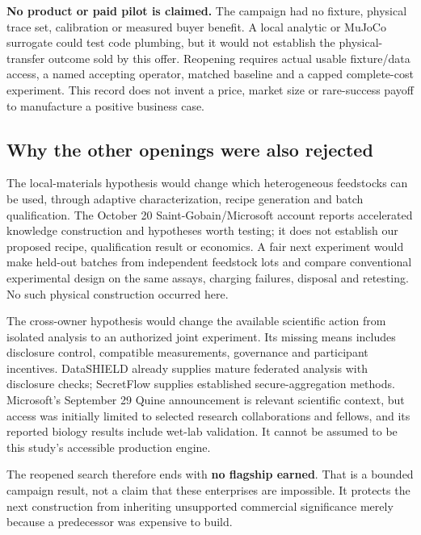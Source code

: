 \textbf{No product or paid pilot is claimed.} The campaign had no fixture, physical trace set, calibration or measured buyer benefit. A local analytic or MuJoCo surrogate could test code plumbing, but it would not establish the physical-transfer outcome sold by this offer. Reopening requires actual usable fixture/data access, a named accepting operator, matched baseline and a capped complete-cost experiment. This record does not invent a price, market size or rare-success payoff to manufacture a positive business case.

\subsection{Why the other openings were also rejected}
The local-materials hypothesis would change which heterogeneous feedstocks can be used, through adaptive characterization, recipe generation and batch qualification. The October 20 Saint-Gobain/Microsoft account reports accelerated knowledge construction and hypotheses worth testing; it does not establish our proposed recipe, qualification result or economics. A fair next experiment would make held-out batches from independent feedstock lots and compare conventional experimental design on the same assays, charging failures, disposal and retesting. No such physical construction occurred here.\cite{saintgobain}

The cross-owner hypothesis would change the available scientific action from isolated analysis to an authorized joint experiment. Its missing means includes disclosure control, compatible measurements, governance and participant incentives. DataSHIELD already supplies mature federated analysis with disclosure checks; SecretFlow supplies established secure-aggregation methods. Microsoft's September 29 Quine announcement is relevant scientific context, but access was initially limited to selected research collaborations and fellows, and its reported biology results include wet-lab validation. It cannot be assumed to be this study's accessible production engine.\cite{datashield,secretflow,quine}

The reopened search therefore ends with \textbf{no flagship earned}. That is a bounded campaign result, not a claim that these enterprises are impossible. It protects the next construction from inheriting unsupported commercial significance merely because a predecessor was expensive to build.
